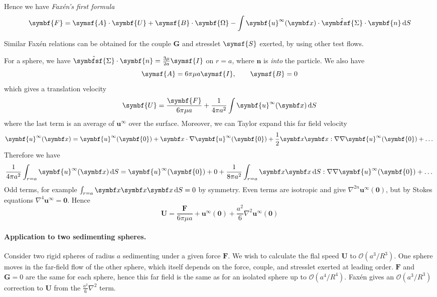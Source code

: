 \documentclass{jknotes}
\begin{document}
Hence we have \emph{Fax\'{e}n's first formula}
\begin{equation}
	\symbf{F} = \symsf{A}\cdot\symbf{U} + \symsf{B} \cdot \symbf{\Omega} - \int
	\symbf{u}^\infty(\x) \cdot
	\hat{\symbfsf{\Sigma}}\cdot\symbf{n}\,\diffd S
\end{equation}

Similar Fax\'{e}n relations can be obtained for the couple $\symbf{G}$ and
stresslet $\symsf{S}$ exerted, by using other test flows.

\begin{eg}
	For a sphere, we have $\hat{\symbfsf{\Sigma}}\cdot\symbf{n} =
	\frac{3\mu}{2a} \symsf{I}$ on $r=a$, where $\symbf{n}$ is \emph{into} the
	particle. We also have
	\begin{equation}
		\symsf{A} = 6\pi \mu a \symsf{I}, \hspace{2em} \symsf{B} = 0
	\end{equation}
	which gives a translation velocity
	\begin{equation}
		\symbf{U} = \frac{\symbf{F}}{6\pi\mu a} + \frac{1}{4\pi a^2} \int
		\symbf{u}^\infty(\x) \, \diffd S
	\end{equation}
	where the last term is an average of $\symbf{u}^\infty$ over the surface.
	Moreover, we can Taylor expand this far field velocity
	\begin{equation}
		\symbf{u}^\infty(\x) = \symbf{u}^\infty(\symbf{0}) + \x \cdot \nabla \symbf{u}^\infty(\symbf{0})
		+ \frac{1}{2}\x\x:\nabla\nabla \symbf{u}^\infty(\symbf{0}) + \dots
	\end{equation}
	Therefore we have
	\begin{equation}
		\frac{1}{4\pi a^2} \int_{r=a} \symbf{u}^\infty(\x) \, \diffd S =
		\symbf{u}^\infty(\symbf{0}) + 0 + \frac{1}{8\pi a^2} \int_{r=a} \x \x \, \diffd
		S : \nabla \nabla \symbf{u}^\infty(\symbf{0}) + \dots
	\end{equation}
	Odd terms, for example $\int_{r=a} \x\x\x\,\diffd S = 0$ by symmetry. Even
	terms are isotropic and give $\nabla^{2n} \symbf{u}^\infty(\symbf{0})$, but by
	Stokes equations $\nabla^4 \symbf{u}^\infty = \symbf{0}$. Hence
	\begin{equation}
		\symbf{U} = \frac{\symbf{F}}{6\pi\mu a} + \symbf{u}^\infty(\symbf{0}) + \frac{a^2}{6}
		\nabla^2 \symbf{u}^\infty(\symbf{0})
	\end{equation}
\end{eg}

\paragraph{Application to two sedimenting spheres.}
Consider two rigid spheres of radius $a$ sedimenting under a given force
$\symbf{F}$. We wish to calculate the flal speed $\symbf{U}$ to
$\mathcal{O}(a^3/R^3)$. One sphere moves in the far-field flow of the other
sphere, which itself depends on the force, couple, and stresslet exerted at
leading order. $\symbf{F}$ and $\symbf{G} = 0$ are the same for each sphere, hence
this far field is the same as for an isolated sphere up to
$\mathcal{O}(a^4/R^4)$. Fax\'{e}n gives an $\mathcal{O}(a^3/R^3)$ correction
to $\symbf{U}$ from the $\frac{a^2}{6}\nabla^2$ term.
\end{document}
